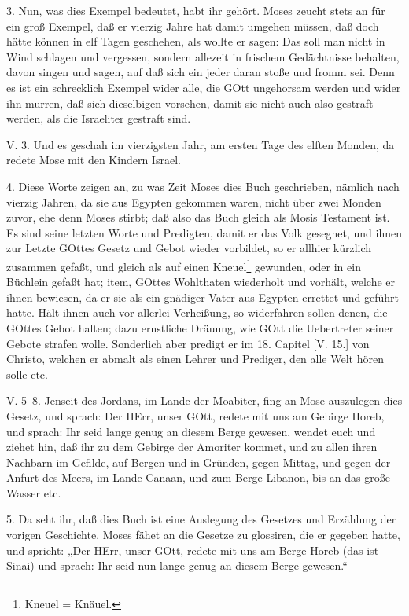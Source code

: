 3. Nun, was dies Exempel bedeutet, habt ihr gehört. Moses zeucht stets an für ein groß Exempel, daß er vierzig Jahre hat damit umgehen müssen, daß doch hätte können in elf Tagen geschehen, als wollte er sagen: Das soll man nicht in Wind schlagen und vergessen, sondern allezeit in frischem Gedächtnisse behalten, davon singen und sagen, auf daß sich ein jeder daran stoße und fromm sei. Denn es ist ein
schrecklich Exempel wider alle, die GOtt ungehorsam werden und wider ihn murren, daß sich dieselbigen vorsehen, damit sie nicht auch also gestraft werden, als die Israeliter gestraft sind.

\begin{schriftzitat}
V. 3. Und es geschah im vierzigsten Jahr, am ersten Tage des elften Monden, da redete Mose mit den Kindern Israel.
\end{schriftzitat}

4. Diese Worte zeigen an, zu was Zeit Moses dies Buch geschrieben, nämlich nach vierzig Jahren, da sie aus Egypten gekommen waren, nicht über zwei Monden zuvor, ehe denn Moses stirbt; daß also das Buch gleich als Mosis Testament ist. Es sind seine letzten Worte und Predigten, damit er das Volk gesegnet, und ihnen zur Letzte GOttes Gesetz und Gebot wieder vorbildet, so er allhier kürzlich zusammen gefaßt, und gleich als auf einen Kneuel\footnote{Kneuel = Knäuel.} gewunden, oder in ein Büchlein gefaßt hat; item, GOttes Wohlthaten wiederholt und vorhält, welche er ihnen bewiesen, da er sie als ein gnädiger Vater aus Egypten errettet und geführt hatte. Hält ihnen auch vor allerlei Verheißung, so widerfahren sollen denen, die GOttes Gebot halten; dazu ernstliche Dräuung, wie GOtt die Uebertreter seiner Gebote strafen wolle. Sonderlich aber predigt er im 18. Capitel [V. 15.] von Christo, welchen er abmalt als einen Lehrer und Prediger, den alle Welt hören solle etc.

\begin{schriftzitat}
V. 5–8. Jenseit des Jordans, im Lande der Moabiter, fing an Mose auszulegen dies Gesetz, und sprach: Der HErr, unser GOtt, redete mit uns am Gebirge Horeb, und sprach: Ihr seid lange genug an diesem Berge gewesen, wendet euch und ziehet hin, daß ihr zu dem Gebirge der Amoriter kommet, und zu allen ihren Nachbarn im Gefilde, auf Bergen und in Gründen, gegen Mittag, und gegen der Anfurt des Meers, im Lande Canaan, und zum Berge Libanon, bis an das große Wasser etc.
\end{schriftzitat}

5. Da seht ihr, daß dies Buch ist eine Auslegung des Gesetzes und Erzählung der vorigen Geschichte. Moses fähet an die Gesetze zu glossiren, die er gegeben hatte, und spricht: „Der HErr, unser GOtt, redete mit uns am Berge Horeb (das ist Sinai) und sprach: Ihr seid nun lange genug an diesem Berge gewesen.“

